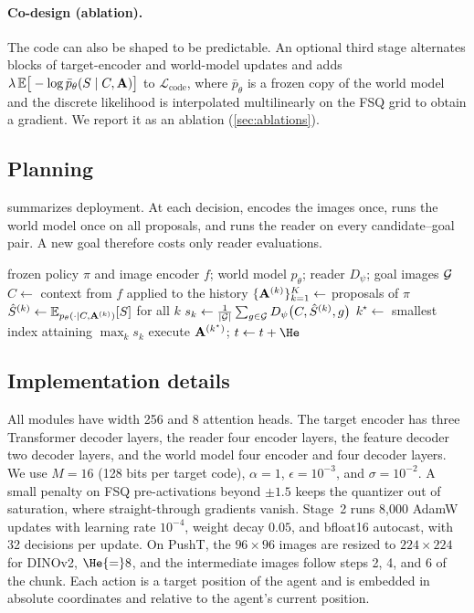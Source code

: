 \paragraph{Co-design (ablation).}
The code can also be shaped to be predictable.
An optional third stage alternates blocks of target-encoder and world-model updates and adds $\lambda\,\mathbb{E}\big[-\log \bar p_\theta(S\mid C,\mathbf{A})\big]$ to $\mathcal{L}_{\mathrm{code}}$, where $\bar p_\theta$ is a frozen copy of the world model and the discrete likelihood is interpolated multilinearly on the FSQ grid to obtain a gradient.
We report it as an ablation (\cref{sec:ablations}).

\subsection{Planning}
\label{sec:planning}
 summarizes deployment.
At each decision, \method encodes the images once, runs the world model once on all proposals, and runs the reader on every candidate--goal pair.
A new goal therefore costs only reader evaluations.

\begin{algorithm}[t]
\caption{Selecting among policy proposals with \method.}
\label{alg:cta}
\small
\begin{algorithmic}[1]
\Require frozen policy $\pi$ and image encoder $f$; world model $p_\theta$; reader $D_\psi$; goal images $\mathcal{G}$
  \State $C\gets$ context from $f$ applied to the history 
  \State $\{\mathbf{A}^{(k)}\}_{k=1}^{K}\gets$ proposals of $\pi$
  \State $\hat S^{(k)}\gets\mathbb{E}_{p_\theta(\cdot\mid C,\mathbf{A}^{(k)})}[S]$ for all $k$ 
  \State $s_k\gets\frac{1}{|\mathcal{G}|}\sum_{g\in\mathcal{G}}D_\psi\big(C,\hat S^{(k)},g\big)$
  \State $k^\star\gets$ smallest index attaining $\max_k s_k$ 
  \State execute $\mathbf{A}^{(k^\star)}$; $t\gets t+\He$
\EndWhile
\end{algorithmic}
\end{algorithm}

\subsection{Implementation details}
\label{sec:impl}
All modules have width 256 and 8 attention heads.
The target encoder has three Transformer decoder layers, the reader four encoder layers, the feature decoder two decoder layers, and the world model four encoder and four decoder layers.
We use $M{=}16$ (128 bits per target code), $\alpha{=}1$, $\epsilon{=}10^{-3}$, and $\sigma{=}10^{-2}$.
A small penalty on FSQ pre-activations beyond $\pm1.5$ keeps the quantizer out of saturation, where straight-through gradients vanish.
Stage~2 runs 8{,}000 AdamW updates with learning rate $10^{-4}$, weight decay $0.05$, and bfloat16 autocast, with 32 decisions per update.
On PushT, the $96{\times}96$ images are resized to $224{\times}224$ for DINOv2, $\He{=}8$, and the intermediate images follow steps 2, 4, and 6 of the chunk.
Each action is a target position of the agent and is embedded in absolute coordinates and relative to the agent's current position.
